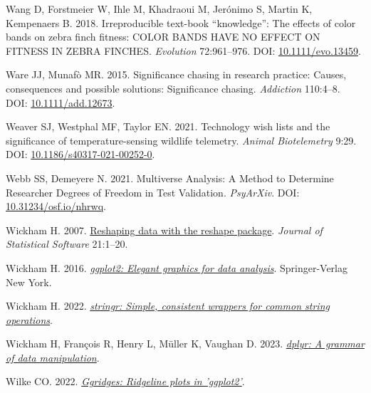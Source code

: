 \documentclass[10pt,a4paper]{article}
\newlength{\cslhangindent}
\newlength{\cslentryspacingunit} %
\newenvironment{CSLReferences}[2] %
 {%
  \setlength{\parindent}{0pt}
  \ifodd #1
  \let\oldpar\par
  \def\par{\hangindent=\cslhangindent\oldpar}
  \fi
  \setlength{\parskip}{#2\cslentryspacingunit}
 }%
 {}
\begin{document}
\begin{CSLReferences}{1}{0}
\leavevmode{}%
Wang D, Forstmeier W, Ihle M, Khadraoui M, Jerónimo S, Martin K, Kempenaers B. 2018. Irreproducible text-book {``knowledge''}: {The} effects of color bands on zebra finch fitness: {COLOR} {BANDS} {HAVE} {NO} {EFFECT} {ON} {FITNESS} {IN} {ZEBRA} {FINCHES}. \emph{Evolution} 72:961--976. DOI: \href{https://doi.org/10.1111/evo.13459}{10.1111/evo.13459}.

\leavevmode{}%
Ware JJ, Munafò MR. 2015. Significance chasing in research practice: Causes, consequences and possible solutions: {Significance} chasing. \emph{Addiction} 110:4--8. DOI: \href{https://doi.org/10.1111/add.12673}{10.1111/add.12673}.

\leavevmode{}%
Weaver SJ, Westphal MF, Taylor EN. 2021. Technology wish lists and the significance of temperature-sensing wildlife telemetry. \emph{Animal Biotelemetry} 9:29. DOI: \href{https://doi.org/10.1186/s40317-021-00252-0}{10.1186/s40317-021-00252-0}.

\leavevmode{}%
Webb SS, Demeyere N. 2021. Multiverse {Analysis}: {A} {Method} to {Determine} {Researcher} {Degrees} of {Freedom} in {Test} {Validation}. \emph{PsyArXiv}. DOI: \href{https://doi.org/10.31234/osf.io/nhrwq}{10.31234/osf.io/nhrwq}.

\leavevmode{}%
Wickham H. 2007. \href{http://www.jstatsoft.org/v21/i12/}{Reshaping data with the {reshape} package}. \emph{Journal of Statistical Software} 21:1--20.

\leavevmode{}%
Wickham H. 2016. \emph{\href{https://ggplot2.tidyverse.org}{ggplot2: Elegant graphics for data analysis}}. Springer-Verlag New York.

\leavevmode{}%
Wickham H. 2022. \emph{\href{https://CRAN.R-project.org/package=stringr}{{stringr}: Simple, consistent wrappers for common string operations}}.

\leavevmode{}%
Wickham H, François R, Henry L, Müller K, Vaughan D. 2023. \emph{\href{https://CRAN.R-project.org/package=dplyr}{{dplyr}: A grammar of data manipulation}}.

\leavevmode{}%
Wilke CO. 2022. \emph{\href{https://CRAN.R-project.org/package=ggridges}{Ggridges: Ridgeline plots in 'ggplot2'}}.


\end{CSLReferences}
\end{document}
